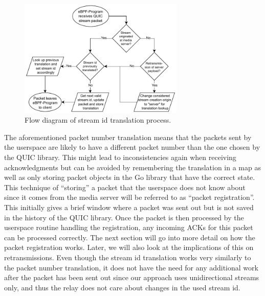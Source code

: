\vspace{0.5cm}
\begin{figure}[H]
    \centering
    \includegraphics[width=0.7\textwidth]{figures/03_fast_relays/stream-id-translation.drawio.pdf}
    \caption[Stream id translation schematic]{Flow diagram of stream id translation process.}\label{fig:stream-id-translation}
\end{figure}
The aforementioned packet number translation means that the packets sent by the userspace are 
likely to have a different packet number than the one chosen by the QUIC library.
This might lead to inconsistencies again when receiving acknowledgments but can be avoided by 
remembering the translation in a map as well as only storing packet objects in the 
Go library that have the correct state.
This technique of ``storing'' a packet that the userspace does not know
about since it comes from the media server will be referred to as ``packet registration''.
This initially gives a brief window where a packet was sent out but is not saved in the history
of the QUIC library.
Once the packet is then processed by the userspace routine handling the 
registration, any incoming ACKs for this packet can be processed correctly.
The next section will go into more detail on how the packet registration works.
Later, we will also look at the implications of this on retransmissions.
Even though the stream id translation works very similarly to the packet number translation, it 
does not have the need for any additional work after the packet has been sent out since our 
approach uses unidirectional streams only, and thus the relay does not care about changes in 
the used stream id. %

